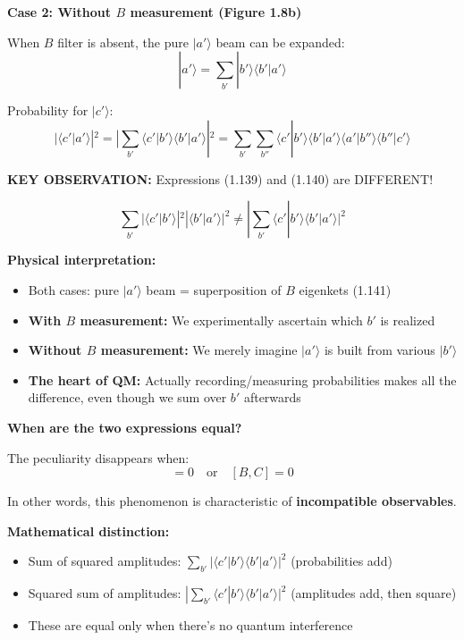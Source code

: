 \documentclass[11pt,a4paper]{article}
\begin{document}
\textbf{Case 2: Without $B$ measurement (Figure 1.8b)}

When $B$ filter is absent, the pure $|a'\rangle$ beam can be expanded:
\begin{equation}
|a'\rangle = \sum_{b'}|b'\rangle\langle b'|a'\rangle
\tag{1.141}
\end{equation}

Probability for $|c'\rangle$:
\begin{equation}
|\langle c'|a'\rangle|^2 = |\sum_{b'}\langle c'|b'\rangle\langle b'|a'\rangle|^2 = \sum_{b'}\sum_{b''}\langle c'|b'\rangle\langle b'|a'\rangle\langle a'|b''\rangle\langle b''|c'\rangle
\tag{1.140}
\end{equation}

\textbf{KEY OBSERVATION:} Expressions (1.139) and (1.140) are DIFFERENT!

\begin{equation}
\boxed{\sum_{b'}|\langle c'|b'\rangle|^2|\langle b'|a'\rangle|^2 \neq |\sum_{b'}\langle c'|b'\rangle\langle b'|a'\rangle|^2}
\end{equation}

\textbf{Physical interpretation:}
\begin{itemize}
\item Both cases: pure $|a'\rangle$ beam = superposition of $B$ eigenkets (1.141)
\item \textbf{With $B$ measurement:} We experimentally ascertain which $b'$ is realized
\item \textbf{Without $B$ measurement:} We merely imagine $|a'\rangle$ is built from various $|b'\rangle$
\item \textbf{The heart of QM:} Actually recording/measuring probabilities makes all the difference, even though we sum over $b'$ afterwards
\end{itemize}

\textbf{When are the two expressions equal?}

The peculiarity disappears when:
\begin{equation}
[A, B] = 0 \quad \text{or} \quad [B, C] = 0
\tag{1.142}
\end{equation}

In other words, this phenomenon is characteristic of \textbf{incompatible observables}.

\textbf{Mathematical distinction:}
\begin{itemize}
\item Sum of squared amplitudes: $\sum_{b'}|\langle c'|b'\rangle\langle b'|a'\rangle|^2$ (probabilities add)
\item Squared sum of amplitudes: $|\sum_{b'}\langle c'|b'\rangle\langle b'|a'\rangle|^2$ (amplitudes add, then square)
\item These are equal only when there's no quantum interference
\end{itemize}
\end{document}
